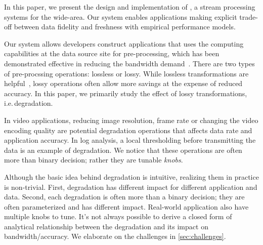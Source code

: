 In this paper, we present the design and implementation of \sysname{}, a stream
processing systems for the wide-area. Our system enables applications making
explicit trade-off between data fidelity and freshness with empirical
performance models.

Our system allows developers construct applications that uses the computing
capabilities at the data source site for pre-processing, which has been
demonstrated effective in reducing the bandwidth demand~\cite{pu2015low,
  viswanathan2016clarinet}. There are two types of pre-procssing operations:
lossless or lossy. While lossless transformations are
helpful~\cite{rabkin2014aggregation}, lossy operations often allow more savings
at the expense of reduced accuracy. In this paper, we primarily study the effect
of lossy transformations, i.e.\,degradation.

In video applications, reducing image resolution, frame rate or changing the
video encoding quality are potential degradation operations that affects data
rate and application accuracy. In log analysis, a local thresholding before
transmitting the data is an example of degradation. We notice that these
operations are often more than binary decision; rather they are tunable
\textit{knobs}.

Although the basic idea behind degradation is intuitive, realizing them in
practice is non-trivial. First, degradation has different impact for different
application and data. Second, each degradation is often more than a binary
decision; they are often parameterized and has different impact. Real-world
application also have multiple knobs to tune. It's not always possible to derive
a closed form of analytical relationship between the degradation and its impact
on bandwidth/accuracy. We elaborate on the challenges in
\autoref{sec:challenges}.




